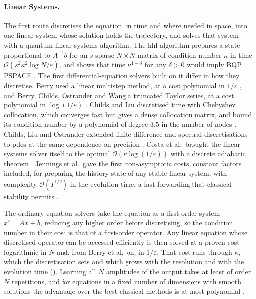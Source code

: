 \paragraph{Linear Systems.}
\label{sec:bg-de-linear}

The first route discretises the equation, in time and where needed in space, into one linear system whose solution holds the trajectory, and solves that system with a quantum linear-systems algorithm. The \gls{hhl} algorithm prepares a state proportional to $A^{-1}b$ for an $s$-sparse $N\times N$ matrix of condition number $\kappa$ in time $\tilde{\mathcal O}(s^2\kappa^2\log N/\varepsilon)$, and shows that time $\kappa^{1-\delta}$ for any $\delta>0$ would imply BQP $=$ PSPACE \cite{harrow2009hhl}. The first differential-equation solvers built on it differ in how they discretise. Berry used a linear multistep method, at a cost polynomial in $1/\varepsilon$ \cite{berry2014highorder}, and Berry, Childs, Ostrander and Wang a truncated Taylor series, at a cost polynomial in $\log(1/\varepsilon)$ \cite{berry2017linearode}. Childs and Liu discretised time with Chebyshev collocation, which converges fast but gives a dense collocation matrix, and bound its condition number by a polynomial of degree $3.5$ in the number of nodes \cite{childsliu2020spectral}. Childs, Liu and Ostrander extended finite-difference and spectral discretisations to \glspl{pde} at the same dependence on precision \cite{childsliuostrander2021pde}. Costa et al.\ brought the linear-systems solver itself to the optimal $\mathcal O(\kappa\log(1/\varepsilon))$ with a discrete adiabatic theorem \cite{costa2022optimal}. Jennings et al.\ gave the first non-asymptotic costs, constant factors included, for preparing the history state of any stable linear system, with complexity $\mathcal O(T^{1/2})$ in the evolution time, a fast-forwarding that classical stability permits \cite{jennings2023cost}.

The ordinary-equation solvers take the equation as a first-order system $x'=Ax+b$, reducing any higher order before discretising, so the condition number in their cost is that of a first-order operator. Any linear equation whose discretised operator can be accessed efficiently is then solved at a proven cost logarithmic in $N$ and, from Berry et al.\ on, in $1/\varepsilon$. That cost runs through $\kappa$, which the discretisation sets and which grows with the resolution and with the evolution time (). Learning all $N$ amplitudes of the output takes at least of order $N$ repetitions, and for equations in a fixed number of dimensions with smooth solutions the advantage over the best classical methods is at most polynomial \cite{montanaro2016fem}.

